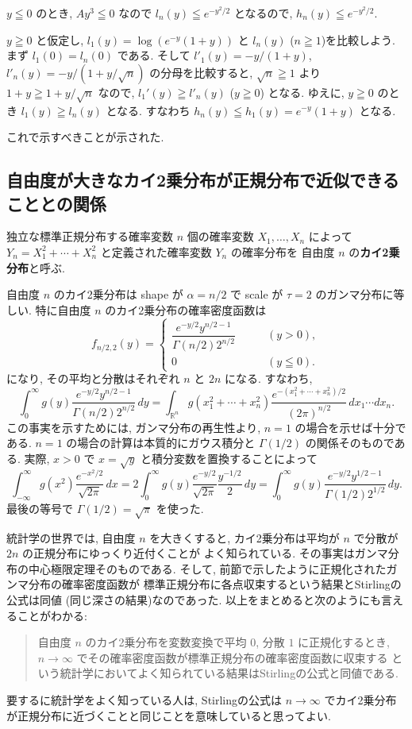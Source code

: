 \documentclass[12pt,twoside]{jarticle}
\newcommand\R{{\mathbb R}} %
\theoremstyle{jplain}
\theoremstyle{jplain}
\theoremstyle{jplain}
\numberwithin{theorem}{section}
\numberwithin{equation}{section}
\numberwithin{figure}{section}
\numberwithin{table}{section}
\begin{document}
$y\leqq 0$ のとき,
$Ay^3\leqq 0$ なので $l_n(y)\leqq e^{-y^2/2}$ となるので,
$h_n(y)\leqq e^{-y^2/2}$.

$y\geqq 0$ と仮定し, $l_1(y)=\log(e^{-y}(1+y))$ と $l_n(y)$ ($n\geqq 1$)を比較しよう.
まず $l_1(0)=l_n(0)$ である.
そして $l'_1(y)=-y/(1+y)$, $l'_n(y)=-y/(1+y/\sqrt{n})$
の分母を比較すると,
$\sqrt{n}\geqq 1$ より $1+y\geqq 1+y/\sqrt{n}$ なので,
$l_1'(y)\geqq l'_n(y)$ ($y\geqq 0$) となる.
ゆえに, $y\geqq 0$ のとき $l_1(y)\geqq l_n(y)$ となる.
すなわち $h_n(y)\leqq h_1(y)=e^{-y}(1+y)$ となる.

これで示すべきことが示された.


\subsection{自由度が大きなカイ2乗分布が正規分布で近似できることとの関係}

独立な標準正規分布する確率変数 $n$ 個の確率変数 $X_1,\ldots,X_n$
によって $Y_n=X_1^2+\cdots+X_n^2$ と定義された確率変数 $Y_n$ の確率分布を
自由度 $n$ の{\bfseries カイ2乗分布}と呼ぶ.

自由度 $n$ のカイ2乗分布は
shape が $\alpha=n/2$ で scale が $\tau=2$ のガンマ分布に等しい.
特に自由度 $n$ のカイ2乗分布の確率密度函数は
\[
f_{n/2,2}(y) =
\begin{cases}
\dfrac{e^{-y/2}y^{n/2-1}}{\Gamma(n/2)2^{n/2}} & \qquad (y>0), \\
0 & \qquad (y\leqq 0).
\end{cases}
\]
になり, その平均と分散はそれぞれ $n$ と $2n$ になる. すなわち,
\[
\int_0^\infty g(y) \frac{e^{-y/2}y^{n/2-1}}{\Gamma(n/2)2^{n/2}}\,dy
=\int_{\R^n} g(x_1^2+\cdots+x_n^2) \frac{e^{-(x_1^2+\cdots+x_n^2)/2}}{(2\pi)^{n/2}}\,dx_1\cdots dx_n.
\]
この事実を示すためには, ガンマ分布の再生性より, $n=1$ の場合を示せば十分である.
$n=1$ の場合の計算は本質的にガウス積分と $\Gamma(1/2)$ の関係そのものである.
実際, $x>0$ で $x=\sqrt{y}$ と積分変数を置換することによって
\[
\int_{-\infty}^\infty g(x^2)\frac{e^{-x^2/2}}{\sqrt{2\pi}}\,dx
=2\int_0^\infty g(y) \frac{e^{-y/2}}{\sqrt{2\pi}}\frac{y^{-1/2}}{2}\,dy
=\int_0^\infty g(y)\frac{e^{-y/2}y^{1/2-1}}{\Gamma(1/2)2^{1/2}}\,dy.
\]
最後の等号で $\Gamma(1/2)=\sqrt{\pi}$ を使った.

統計学の世界では, 自由度 $n$ を大きくすると,
カイ2乗分布は平均が $n$ で分散が $2n$ の正規分布にゆっくり近付くことが
よく知られている.
その事実はガンマ分布の中心極限定理そのものである.
そして, 前節で示したように正規化されたガンマ分布の確率密度函数が
標準正規分布に各点収束するという結果とStirlingの公式は同値
(同じ深さの結果)なのであった.
以上をまとめると次のようにも言えることがわかる:
\begin{quote}
自由度 $n$ のカイ2乗分布を変数変換で平均 $0$, 分散 $1$ に正規化するとき,
$n\to\infty$ でその確率密度函数が標準正規分布の確率密度函数に収束する
という統計学においてよく知られている結果はStirlingの公式と同値である.
\end{quote}
要するに統計学をよく知っている人は, Stirlingの公式は
$n\to\infty$ でカイ2乗分布が正規分布に近づくことと同じことを意味していると思ってよい.
\end{document}
